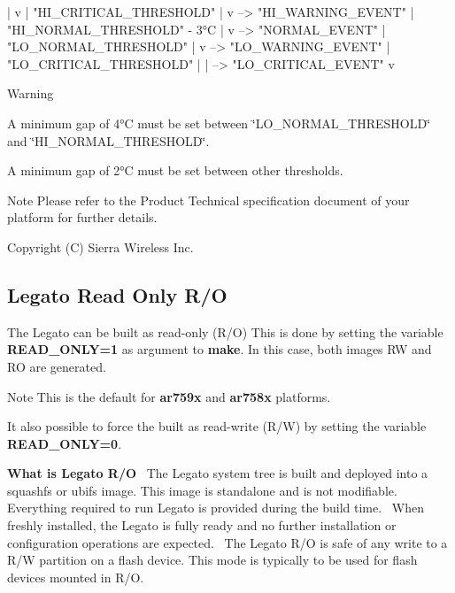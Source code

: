 \begin{DoxyVerb}      |
      v
      |
 "HI_CRITICAL_THRESHOLD"
      |
      v           --> "HI_WARNING_EVENT"
      |
 "HI_NORMAL_THRESHOLD" - 3°C
      |
      v           --> "NORMAL_EVENT"
      |
 "LO_NORMAL_THRESHOLD"
      |
      v           --> "LO_WARNING_EVENT"
      |
 "LO_CRITICAL_THRESHOLD"
      |
      |           --> "LO_CRITICAL_EVENT"
      v
\end{DoxyVerb}


\begin{DoxyWarning}{Warning}

\begin{DoxyItemize}
\item A minimum gap of 4°C must be set between \char`\"{}\+L\+O\+\_\+\+N\+O\+R\+M\+A\+L\+\_\+\+T\+H\+R\+E\+S\+H\+O\+L\+D\char`\"{} and \char`\"{}\+H\+I\+\_\+\+N\+O\+R\+M\+A\+L\+\_\+\+T\+H\+R\+E\+S\+H\+O\+L\+D\char`\"{}.
\item A minimum gap of 2°C must be set between other thresholds.
\end{DoxyItemize}
\end{DoxyWarning}
\begin{DoxyNote}{Note}
Please refer to the Product Technical specification document of your platform for further details.
\end{DoxyNote}
Copyright (C) Sierra Wireless Inc. \hypertarget{platformConstraintsReadOnly}{}\subsection{Legato Read Only R/O}\label{platformConstraintsReadOnly}
The Legato can be built as read-\/only (R/O) This is done by setting the variable {\bfseries {\ttfamily R\+E\+A\+D\+\_\+\+O\+N\+LY=1}} as argument to {\bfseries {\ttfamily make}}. In this case, both images RW and RO are generated.

\begin{DoxyNote}{Note}
This is the default for {\bfseries ar759x} and {\bfseries ar758x} platforms.
\end{DoxyNote}
It also possible to force the built as read-\/write (R/W) by setting the variable {\bfseries {\ttfamily R\+E\+A\+D\+\_\+\+O\+N\+LY=0}}.

{\bfseries What is Legato R/O}~\newline
 The Legato system tree is built and deployed into a squashfs or ubifs image. This image is standalone and is not modifiable. Everything required to run Legato is provided during the build time.~\newline
 When freshly installed, the Legato is fully ready and no further installation or configuration operations are expected.~\newline
 The Legato R/O is safe of any write to a R/W partition on a flash device. This mode is typically to be used for flash devices mounted in R/O.

